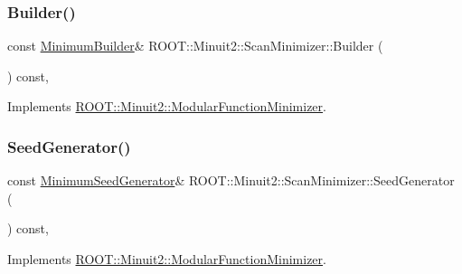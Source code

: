 \mbox{\label{classROOT_1_1Minuit2_1_1ScanMinimizer_a6ca4b63ec20ed8dd310e02d427ef05fa}} 
\subsubsection{\texorpdfstring{Builder()}{Builder()}\hspace{0.1cm}{\footnotesize\ttfamily [2/2]}}
{\footnotesize\ttfamily const \mbox{\hyperlink{classROOT_1_1Minuit2_1_1MinimumBuilder}{Minimum\+Builder}}\& R\+O\+O\+T\+::\+Minuit2\+::\+Scan\+Minimizer\+::\+Builder (\begin{DoxyParamCaption}{ }\end{DoxyParamCaption}) const\hspace{0.3cm}{\ttfamily [inline]}, {\ttfamily [virtual]}}



Implements \mbox{\hyperlink{classROOT_1_1Minuit2_1_1ModularFunctionMinimizer_a13e98551cf14e927c61e1e34ecf8ba8b}{R\+O\+O\+T\+::\+Minuit2\+::\+Modular\+Function\+Minimizer}}.

\mbox{\label{classROOT_1_1Minuit2_1_1ScanMinimizer_aaad34811cf2862cd8b66b634a1c9ba07}} 
\subsubsection{\texorpdfstring{SeedGenerator()}{SeedGenerator()}\hspace{0.1cm}{\footnotesize\ttfamily [1/2]}}
{\footnotesize\ttfamily const \mbox{\hyperlink{classROOT_1_1Minuit2_1_1MinimumSeedGenerator}{Minimum\+Seed\+Generator}}\& R\+O\+O\+T\+::\+Minuit2\+::\+Scan\+Minimizer\+::\+Seed\+Generator (\begin{DoxyParamCaption}{ }\end{DoxyParamCaption}) const\hspace{0.3cm}{\ttfamily [inline]}, {\ttfamily [virtual]}}



Implements \mbox{\hyperlink{classROOT_1_1Minuit2_1_1ModularFunctionMinimizer_a742930de97b0ce9ba23773874ae0894b}{R\+O\+O\+T\+::\+Minuit2\+::\+Modular\+Function\+Minimizer}}.

